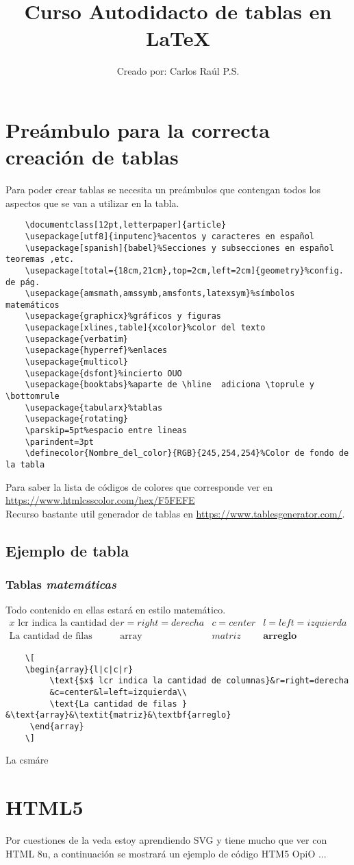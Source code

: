 \documentclass[12pt,letterpaper]{article}
\title{Curso Autodidacto de tablas en LaTeX}
\author{Creado por: Carlos Raúl P.S.}
\begin{document}
\maketitle

\section{Preámbulo para la correcta creación de tablas}
Para poder crear tablas se necesita un preámbulos que contengan todos los aspectos que se van a utilizar en la tabla.
\begin{verbatim}
    \documentclass[12pt,letterpaper]{article}
    \usepackage[utf8]{inputenc}%acentos y caracteres en español
    \usepackage[spanish]{babel}%Secciones y subsecciones en español teoremas ,etc.
    \usepackage[total={18cm,21cm},top=2cm,left=2cm]{geometry}%config. de pág.
    \usepackage{amsmath,amssymb,amsfonts,latexsym}%símbolos matemáticos  
    \usepackage{graphicx}%gráficos y figuras
    \usepackage[xlines,table]{xcolor}%color del texto
    \usepackage{verbatim}
    \usepackage{hyperref}%enlaces
    \usepackage{multicol}
    \usepackage{dsfont}%incierto OUO
    \usepackage{booktabs}%aparte de \hline  adiciona \toprule y \bottomrule
    \usepackage{tabularx}%tablas
    \usepackage{rotating}
    \parskip=5pt%espacio entre lineas 
    \parindent=3pt 
    \definecolor{Nombre_del_color}{RGB}{245,254,254}%Color de fondo de la tabla
\end{verbatim}
Para saber la lista de códigos de colores que corresponde ver en \url{https://www.htmlcsscolor.com/hex/F5FEFE}
\\ 
Recurso bastante util generador de tablas en \url{https://www.tablesgenerator.com/}.
\subsection{Ejemplo de tabla}
\subsubsection{Tablas \textit{matemáticas}  }
Todo contenido en ellas estará en estilo matemático.
\[ 
    \begin{array}{l|c|c|r}
         \text{$x$ lcr indica la cantidad de columnas}&r=right=derecha&c=center&l=left=izquierda\\
         \text{La cantidad de filas } &\text{array}&\textit{matriz}&\textbf{arreglo}
     \end{array}
\]
\begin{verbatim}
    \[ 
    \begin{array}{l|c|c|r}
         \text{$x$ lcr indica la cantidad de columnas}&r=right=derecha
         &c=center&l=left=izquierda\\
         \text{La cantidad de filas } &\text{array}&\textit{matriz}&\textbf{arreglo}
     \end{array}
    \]
\end{verbatim}
La csmáre
\section{HTML5}
Por cuestiones de la veda estoy aprendiendo SVG y tiene mucho que ver con HTML 8u, a continuación se mostrará
un ejemplo de código HTM5 OpiO ...
\end{document}
